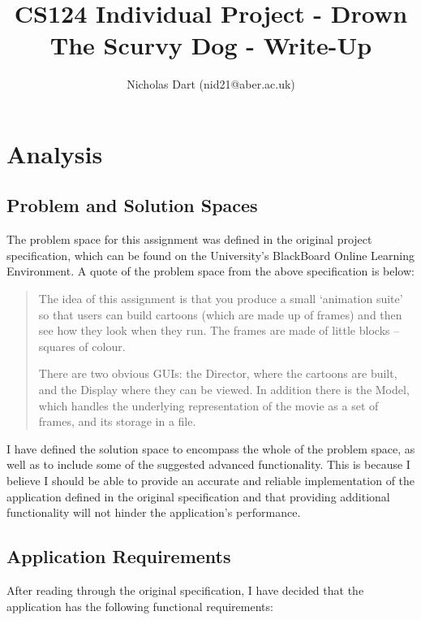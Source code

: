 \documentclass[a4paper, 11pt]{article}
\begin{document}
\title{CS124 Individual Project - Drown The Scurvy Dog - Write-Up}
\author{Nicholas Dart (nid21@aber.ac.uk)}
\date{}

\maketitle
\tableofcontents

\newpage

\section{Analysis}

\subsection{Problem and Solution Spaces}

The problem space for this assignment was defined in the original project specification, which can be found on the University's BlackBoard Online Learning Environment. A quote of the problem space from the above specification is below:

\begin{quote}
The idea of this assignment is that you produce a small ‘animation suite’ so that users can build cartoons (which are made up of frames) and then see how they look when they run. The frames are made of little blocks – squares of colour.

There are two obvious GUIs: the Director, where the cartoons are built, and the Display where they can be viewed. In addition there is the Model, which handles the underlying representation of the movie as a set of frames, and its storage in a file.
\end{quote}

I have defined the solution space to encompass the whole of the problem space, as well as to include some of the suggested advanced functionality. This is because I believe I should be able to provide an accurate and reliable implementation of the application defined in the original specification and that providing additional functionality will not hinder the application's performance.

\subsection{Application Requirements}

After reading through the original specification, I have decided that the application has the following functional requirements:
\end{document}
